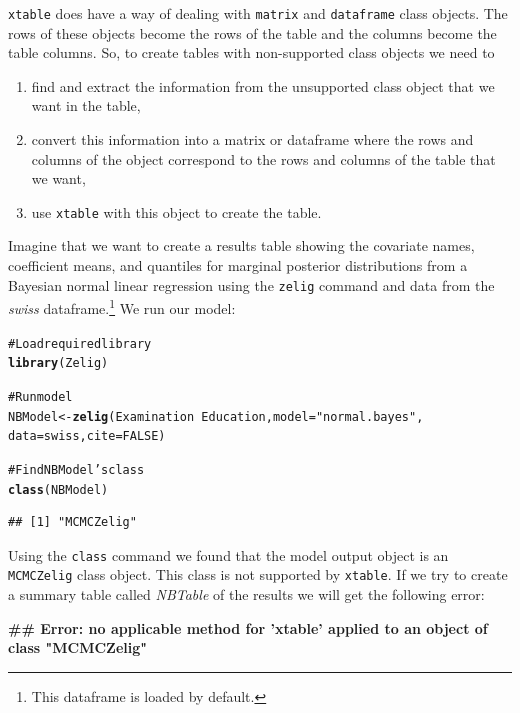 \documentclass[ChapterTOCs,krantz1]{krantz}\usepackage{graphicx, color}
\makeatletter
\newcommand{\hlfunctioncall}[1]{\textcolor[rgb]{0.501960784313725,0,0.329411764705882}{\textbf{#1}}}%
\newcommand{\hlstring}[1]{\textcolor[rgb]{0.6,0.6,1}{#1}}%
\newcommand{\hlcomment}[1]{\textcolor[rgb]{0.180392156862745,0.6,0.341176470588235}{#1}}%
\newenvironment{kframe}{%
 \def\at@end@of@kframe{}%
 \ifinner\ifhmode%
  \def\at@end@of@kframe{\end{minipage}}%
  \begin{minipage}{\columnwidth}%
 \fi\fi%
 \def\FrameCommand##1{\hskip\@totalleftmargin \hskip-\fboxsep
 \colorbox{shadecolor}{##1}\hskip-\fboxsep
     \hskip-\linewidth \hskip-\@totalleftmargin \hskip\columnwidth}%
 \MakeFramed {\advance\hsize-\width
   \@totalleftmargin\z@ \linewidth\hsize
   \@setminipage}}%
 {\par\unskip\endMakeFramed%
 \at@end@of@kframe}
\newenvironment{knitrout}{}{} %
\makeatother
\begin{document}
{\tt{xtable}} does have a way of dealing with {\tt{matrix}} and {\tt{dataframe}} class objects. The rows of these objects become the rows of the table and the columns become the table columns. So, to create tables with non-supported class objects we need to

\begin{enumerate}
    \item find and extract the information from the unsupported class object that we want in the table, 
    \item convert this information into a matrix or dataframe where the rows and columns of the object correspond to the rows and columns of the table that we want,
    \item use {\tt{xtable}} with this object to create the table.
\end{enumerate}

Imagine that we want to create a results table showing the covariate names, coefficient means, and quantiles for marginal posterior distributions from a Bayesian normal linear regression using the {\tt{zelig}} command \cite{Goodrich2007} and data from the {\emph{swiss}} dataframe.\footnote{This dataframe is loaded by default.} We run our model:

\begin{knitrout}
\color{fgcolor}\begin{kframe}
\begin{alltt}
\hlcomment{# Load required library}
\hlfunctioncall{library}(Zelig)

\hlcomment{# Run model}
NBModel <- \hlfunctioncall{zelig}(Examination ~ Education, model = \hlstring{"normal.bayes"}, 
                    data = swiss, cite = FALSE)

\hlcomment{# Find NBModel's class}
\hlfunctioncall{class}(NBModel)
\end{alltt}
\begin{verbatim}
## [1] "MCMCZelig"
\end{verbatim}
\end{kframe}
\end{knitrout}


Using the {\tt{class}} command we found that the model output object is an {\tt{MCMCZelig}} class object. This class is not supported by {\tt{xtable}}. If we try to create a summary table called {\emph{NBTable}} of the results we will get the following error:

\begin{knitrout}
\color{fgcolor}\begin{kframe}


{\ttfamily\noindent\bfseries\textcolor{errorcolor}{\#\# Error: no applicable method for 'xtable' applied to an object of class "MCMCZelig"}}\end{kframe}
\end{knitrout}
\end{document}
